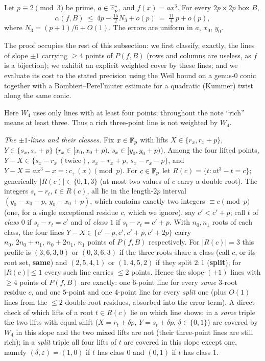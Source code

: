 \begin{theorem}\label{thm:cubic}
Let $p\equiv2\pmod3$ be prime, $a\in\mathbb{F}_p^*$, and $f(x)=ax^3$. For every $2p\times2p$ box $B$,
\[
\alpha(f,B)\ \le\ 4p-\tfrac{15}2N_3+o(p)\ =\ \tfrac{11}4\,p+o(p),
\]
where $N_3=(p+1)/6+O(1)$. The errors are uniform in $a$, $x_0$, $y_0$.
\end{theorem}

The proof occupies the rest of this subsection: we first classify, exactly, the lines of slope $\pm1$ carrying $\ge4$
points of $P(f,B)$ (rows and columns are useless, as $f$ is a bijection); we exhibit an explicit weighted cover by
these lines; and we evaluate its cost to the stated precision using the Weil bound on a genus-$0$ conic together
with a Bombieri--Perel'muter estimate for a quadratic (Kummer) twist along the same conic.

Here $W_4$ uses only lines with at least four points; throughout the note ``rich'' means at least three.  Thus a rich three-point line is not weighted by $W_4$.\par
\smallskip\noindent\emph{The $\pm1$-lines and their classes.} Fix $x\in\mathbb{F}_p$ with lifts $X\in\{r_x,r_x+p\}$,
$Y\in\{s_x,s_x+p\}$ ($r_x\in[x_0,x_0+p)$, $s_x\in[y_0,y_0+p)$). Among the four lifted points,
$Y-X\in\{s_x-r_x\ (\text{twice}),\,s_x-r_x+p,\,s_x-r_x-p\}$, and
$Y-X\equiv ax^3-x=:c_+(x)\pmod p$. For $c\in\mathbb{F}_p$ let $R(c)=\{t:at^3-t=c\}$; generically $|R(c)|\in\{0,1,3\}$ (at
most two values of $c$ carry a double root). The integers $s_t-r_t$, $t\in R(c)$, all lie in the length-$2p$ interval
$(y_0-x_0-p,\,y_0-x_0+p)$, which contains exactly two integers $\equiv c\pmod p$ (one, for a single exceptional
residue $c$, which we ignore), say $c'<c'+p$; call $t$ of
\emph{class $0$} if $s_t-r_t=c'$ and of \emph{class $1$} if $s_t-r_t=c'+p$. With $n_0,n_1$ roots of each class, the
four lines $Y-X\in\{c'-p,c',c'+p,c'+2p\}$ carry $n_0,\,2n_0+n_1,\,n_0+2n_1,\,n_1$ points of $P(f,B)$ respectively.
For $|R(c)|=3$ this profile is $(3,6,3,0)$ or $(0,3,6,3)$ if the three roots share a class (call $c$, or its root
set, \textbf{same}) and $(2,5,4,1)$ or $(1,4,5,2)$ if they split $2\!:\!1$ (\textbf{split}); for $|R(c)|\le1$ every
such line carries $\le2$ points. Hence the slope-$(+1)$ lines with $\ge4$ points of $P(f,B)$ are exactly: one
$6$-point line for every \emph{same} $3$-root residue $c$, and one $5$-point and one $4$-point line for every
\emph{split} one (plus $O(1)$ lines from the $\le2$ double-root residues, absorbed into the error term).
A direct check of which lifts of a root $t\in R(c)$ lie on which line shows: in a \emph{same} triple the two lifts
with equal shift ($X=r_t+\delta p,\,Y=s_t+\delta p$, $\delta\in\{0,1\}$) are covered by $W_4$ in this slope and the two mixed lifts
are not (their three-point lines are still rich); in a \emph{split} triple all four lifts of $t$ are covered in this slope except one, namely $(\delta,\varepsilon)=(1,0)$
if $t$ has class $0$ and $(0,1)$ if $t$ has class $1$.

